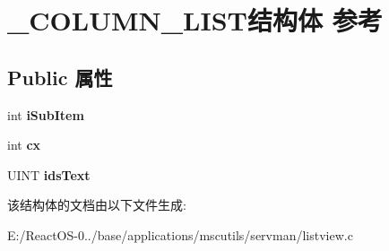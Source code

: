 \hypertarget{struct___c_o_l_u_m_n___l_i_s_t}{}\section{\+\_\+\+C\+O\+L\+U\+M\+N\+\_\+\+L\+I\+S\+T结构体 参考}
\label{struct___c_o_l_u_m_n___l_i_s_t}
\subsection*{Public 属性}
\begin{DoxyCompactItemize}
\item 
\mbox{\label{struct___c_o_l_u_m_n___l_i_s_t_a2d4a8b6f9cfe937df4cce56acc7c5be5}} 
int {\bfseries i\+Sub\+Item}
\item 
\mbox{\label{struct___c_o_l_u_m_n___l_i_s_t_a081bd6311c7b979ac42fe7b90c07504f}} 
int {\bfseries cx}
\item 
\mbox{\label{struct___c_o_l_u_m_n___l_i_s_t_a08cc22a006c324570ed1f9cf35fac60f}} 
U\+I\+NT {\bfseries ids\+Text}
\end{DoxyCompactItemize}


该结构体的文档由以下文件生成\+:\begin{DoxyCompactItemize}
\item 
E\+:/\+React\+O\+S-\/0../base/applications/mscutils/servman/listview.\+c\end{DoxyCompactItemize}
